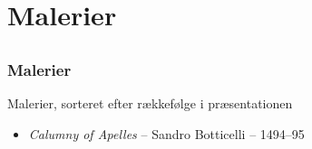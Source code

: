 \documentclass{beamer}
\begin{document}
\begin{frame}
\end{frame}

\section{Malerier}
\subsection*{}
\begin{frame}

    \frametitle{Malerier}

    Malerier, sorteret efter rækkefølge i præsentationen

    \begin{itemize}
        \item \emph{Calumny of Apelles} -- Sandro Botticelli -- 1494--95
    \end{itemize}


\end{frame}
\end{document}

